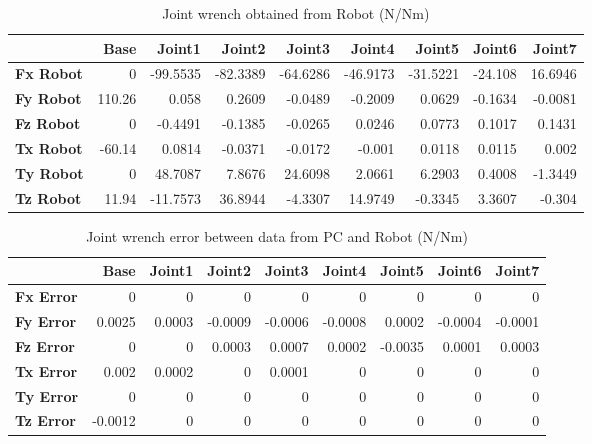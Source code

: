 \begin{table}[h!]
	\centering
	\caption{Joint wrench obtained from Robot (N/Nm)}
	\label{wrech_Robot_Pose12}
	\begin{tabular}{|l|r|r|r|r|r|r|r|r|}
		\hline
		\textbf{} & \textbf{Base} & \textbf{Joint1}  & \textbf{Joint2}  & \textbf{Joint3}  & \textbf{Joint4}  & \textbf{Joint5}  & \textbf{Joint6}  & \textbf{Joint7} \\ \hline
		\textbf{Fx Robot}  & 0        & -99.5535        & -82.3389        & -64.6286        & -46.9173        & -31.5221        & -24.108        & 16.6946 \\ \hline
		\textbf{Fy Robot}  & 110.26        & 0.058        & 0.2609        & -0.0489        & -0.2009        & 0.0629        & -0.1634        & -0.0081 \\ \hline
		\textbf{Fz Robot}  & 0        & -0.4491        & -0.1385        & -0.0265        & 0.0246        & 0.0773        & 0.1017        & 0.1431 \\ \hline
		\textbf{Tx Robot}  & -60.14        & 0.0814        & -0.0371        & -0.0172        & -0.001        & 0.0118        & 0.0115        & 0.002 \\ \hline
		\textbf{Ty Robot}  & 0        & 48.7087        & 7.8676        & 24.6098        & 2.0661        & 6.2903        & 0.4008        & -1.3449 \\ \hline
		\textbf{Tz Robot}  & 11.94        & -11.7573        & 36.8944        & -4.3307        & 14.9749        & -0.3345        & 3.3607        & -0.304 \\ \hline
	\end{tabular}
\end{table}

\begin{table}[h!]
	\centering
	\caption{Joint wrench error between data from PC and Robot (N/Nm)}
	\label{wrech_Error_Pose12}
	\begin{tabular}{|l|r|r|r|r|r|r|r|r|}
		\hline
		\textbf{}  & \textbf{Base} & \textbf{Joint1}  & \textbf{Joint2}  & \textbf{Joint3}  & \textbf{Joint4}  & \textbf{Joint5}  & \textbf{Joint6}  & \textbf{Joint7} \\ \hline
		\textbf{Fx Error}  & 0        & 0        & 0        & 0        & 0        & 0        & 0        & 0 \\ \hline
		\textbf{Fy Error}  & 0.0025        & 0.0003        & -0.0009        & -0.0006        & -0.0008        & 0.0002        & -0.0004        & -0.0001 \\ \hline
		\textbf{Fz Error}  & 0        & 0        & 0.0003        & 0.0007        & 0.0002        & -0.0035        & 0.0001        & 0.0003 \\ \hline
		\textbf{Tx Error}  & 0.002        & 0.0002        & 0        & 0.0001        & 0        & 0        & 0        & 0 \\ \hline
		\textbf{Ty Error}  & 0        & 0        & 0        & 0        & 0        & 0        & 0        & 0 \\ \hline
		\textbf{Tz Error}  & -0.0012        & 0        & 0        & 0        & 0        & 0        & 0        & 0 \\ \hline
	\end{tabular}
\end{table}

